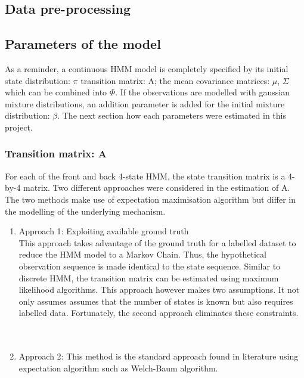 \subsection{Data pre-processing}

\subsection{Parameters of the model}
As a reminder, a continuous HMM model is completely specified by its initial state distribution: \(\pi\) transition matrix: A; the mean covariance matrices: \(\mu\), \(\Sigma\) which can be combined into \(\Phi\). If the observations are modelled with gaussian mixture distributions, an addition parameter is added for the initial mixture distribution: \(\beta\). The next section how each parameters were estimated in this project.

\subsubsection{Transition matrix: A}
For each of the front and back 4-state HMM, the state transition matrix is a 4-by-4 matrix. Two different approaches were considered in the estimation of A. The two methods make use of expectation maximisation algorithm but differ in the modelling of the underlying mechanism.

\begin{enumerate}
	\item Approach 1: Exploiting available ground truth\\
	This approach takes advantage of the ground truth for a labelled dataset to reduce the HMM model to a Markov Chain. Thus, the hypothetical observation sequence is made identical to the state sequence. Similar to discrete HMM, the transition matrix can be estimated using maximum likelihood algorithms. This approach however makes two assumptions. It not only assumes assumes that the number of states is known but also requires labelled data. Fortunately, the second approach eliminates these constraints. \\\\\
	
	\item Approach 2: This method is the standard approach found in literature using expectation algorithm such as Welch-Baum algorithm. %

\end{enumerate}

